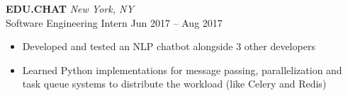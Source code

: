 \documentclass[letterpaper]{article}
\begin{document}
\begin{bgbox}[height=\paperheight, colback=white, width=0.62\textwidth]
		\vspace*{12pt}
		\textbf{EDU.CHAT} \hfill \textit{New York, NY}\\
		Software Engineering Intern \hfill Jun 2017 -- Aug 2017
		\begin{itemize} [noitemsep,topsep=4pt]
			\item Developed and tested an NLP chatbot alongside 3 other developers
			\item Learned Python implementations for message passing, parallelization and task queue systems to distribute the workload (like Celery and Redis)
		\end{itemize}
	\end{bgbox}%
\end{document}
